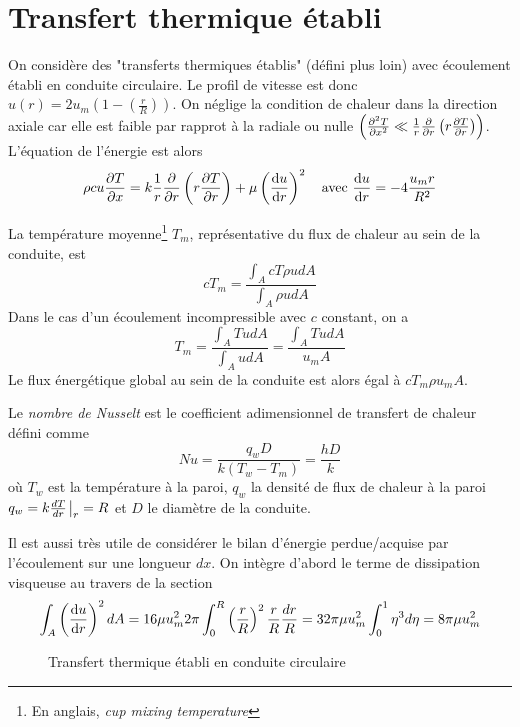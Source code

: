 \documentclass[a4paper,11pt]{report}
\newcommand{\recip}[1]{\frac{1}{#1}}
\begin{document}
  \section{Transfert thermique établi}
    On considère des "transferts thermiques établis" (défini plus loin) avec écoulement établi en conduite circulaire. Le profil de vitesse est donc $u(r) = 2 u_m \left(1 - \left(\frac{r}{R}\right)\right)$. On néglige la condition de chaleur dans la direction axiale car elle est faible par rapprot à la radiale ou nulle $\left(\pdv[2]{T}{x} \ll \recip{r}\pdv{r}\left(r\pdv{T}{r}\right)\right)$. L'équation de l'énergie est alors
    \begin{equation}
      \rho c u \pdv{T}{x} = k \recip{r}\pdv{r} \left(r\pdv{T}{r}\right) + \mu \left(\dv{u}{r}\right)^2 \quad \textrm{avec } \dv{u}{r} = -4\frac{u_mr}{R^2}
    \end{equation}

    La température moyenne\footnote{En anglais, \textit{cup mixing temperature}} $T_m$, représentative du flux de chaleur au sein de la conduite, est
    \begin{equation}
      cT_m = \frac{\int_A c T \rho u dA}{\int_A \rho u dA}
    \end{equation}
    Dans le cas d'un écoulement incompressible avec $c$ constant, on a
    \begin{equation}
      T_m = \frac{\int_A T u dA}{\int_A u dA} = \frac{\int_A T u dA}{u_m A}
    \end{equation}
    Le flux énergétique global au sein de la conduite est alors égal à $c T_m \rho u_m A$.

    Le \textit{nombre de Nusselt} est le coefficient adimensionnel de transfert de chaleur défini comme
    \begin{equation}
      Nu = \frac{q_w D}{k (T_w - T_m)} = \frac{h D}{k}
    \end{equation}
    où $T_w$ est la température à la paroi, $q_w$ la densité de flux de chaleur à la paroi $q_w = k \frac{dT}{dr}\eval_r=R$ et $D$ le diamètre de la conduite.

    Il est aussi très utile de considérer le bilan d'énergie perdue/acquise par l'écoulement sur une longueur $dx$. On intègre d'abord le terme de dissipation visqueuse au travers de la section
    \begin{equation}
      \int_A \left(\dv{u}{r}\right)^2 dA = 16 \mu u_m^2 2\pi \int_0^R \left(\frac{r}{R}\right)^2 \frac{r}{R} \frac{dr}{R} = 32 \pi\mu u_m^2 \int_0^1 \eta^3 d\eta = 8 \pi \mu u_m^2
    \end{equation}
    \begin{figure}[!h]
      \centering
      
      \caption{Transfert thermique établi en conduite circulaire}
      \label{fig:transthermCond}
    \end{figure}
\end{document}
